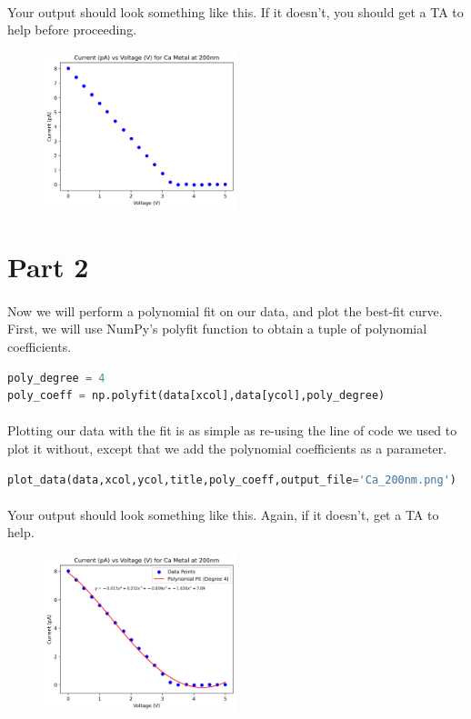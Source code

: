 \documentclass{journal}
\begin{document}
\paragraph{}
Your output should look something like this. If it doesn't, you should get a TA to help before proceeding.
    \begin{figure}[H]
        \centering
        \includegraphics[width=0.5\textwidth]{./Ca_200nm.png}
    \end{figure}

\section*{Part 2}
\paragraph{}
Now we will perform a polynomial fit on our data, and plot the best-fit curve. First, we will use NumPy's polyfit function to obtain a tuple of polynomial coefficients.
\begin{lstlisting}[language=python]
poly_degree = 4
poly_coeff = np.polyfit(data[xcol],data[ycol],poly_degree)
\end{lstlisting}
\paragraph{}
Plotting our data with the fit is as simple as re-using the line of code we used to plot it without, except that we add the polynomial coefficients as a parameter.
\begin{lstlisting}[language=python]
plot_data(data,xcol,ycol,title,poly_coeff,output_file='Ca_200nm.png')
\end{lstlisting}
\paragraph{}
Your output should look something like this. Again, if it doesn't, get a TA to help.
    \begin{figure}[H]
        \centering
        \includegraphics[width=0.5\textwidth]{./Ca_200nm_polyfit.png}
    \end{figure}
\end{document}
